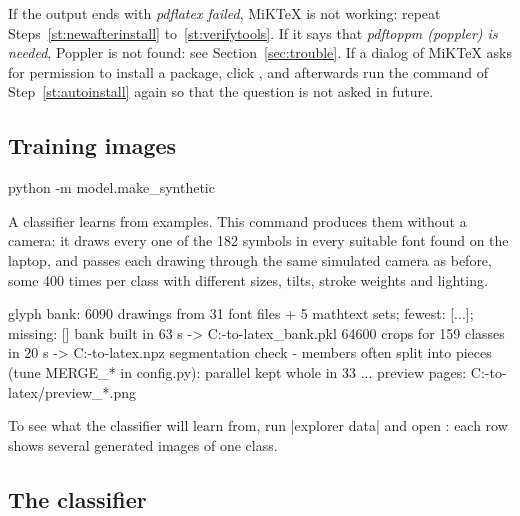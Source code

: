 \begin{iffail}
If the output ends with \emph{pdflatex failed}, MiKTeX is not working: repeat
Steps~\ref{st:newafterinstall} to~\ref{st:verifytools}. If it says that \emph{pdftoppm (poppler)
is needed}, Poppler is not found: see Section~\ref{sec:trouble}. If a dialog of MiKTeX asks for
permission to install a package, click , and afterwards run the command of
Step~\ref{st:autoinstall} again so that the question is not asked in future.
\end{iffail}

\subsection{Training images}

\label{st:synth}
\begin{ps}
python -m model.make_synthetic
\end{ps}
A classifier learns from examples. This command produces them without a camera: it draws every
one of the 182 symbols in every suitable font found on the laptop, and passes each drawing
through the same simulated camera as before, some 400 times per class with different sizes,
tilts, stroke weights and lighting.
\begin{out}
glyph bank: 6090 drawings from 31 font files + 5 mathtext sets; fewest: [...]; missing: []
bank built in 63 s -> C:\camera-to-latex\data\synthetic\glyph_bank.pkl
64600 crops for 159 classes in 20 s -> C:\camera-to-latex\data\synthetic\train.npz
segmentation check - members often split into pieces (tune MERGE_* in config.py):
  parallel         kept whole in 33%
  ...
preview pages: C:\camera-to-latex\data\synthetic/preview_*.png
\end{out}

To see what the classifier will learn from, run \code|explorer data\synthetic| and open
: each row shows several generated images of one class.

\subsection{The classifier}


